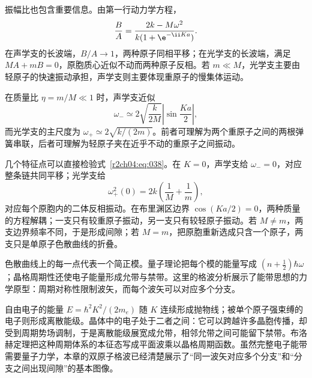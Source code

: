 振幅比也包含重要信息。由第一行动力学方程，
\[
 \frac BA=\frac{2k-M\omega^2}{k(1+\e^{-\ii Ka})}.
\]
在声学支的长波端，$B/A\to1$，两种原子同相平移；在光学支的长波端，满足
$MA+mB=0$，原胞质心近似不动而两种原子反相。若 $m\ll M$，光学支主要由轻原子的快速振动承担，声学支则主要体现重原子的慢集体运动。

在质量比 $\eta=m/M\ll1$ 时，声学支近似
\[
 \omega_-\simeq2\sqrt{\frac{k}{2M}}\left|\sin\frac{Ka}{2}\right|,
\]
而光学支的主尺度为
$\omega_+\simeq2\sqrt{k/(2m)}$。前者可理解为两个重原子之间的两根弹簧串联，后者可理解为轻原子夹在近乎不动的重原子之间振动。

几个特征点可以直接检验式~\eqref{r2ch04:eq:038}。在 $K=0$，声学支给 $\omega_-=0$，对应整条链共同平移；光学支给
\[
 \omega_+^2(0)=2k\left(\frac1M+\frac1m\right),
\]
对应每个原胞内的二体反相振动。在布里渊区边界 $\cos(Ka/2)=0$，两种质量的方程解耦；一支只有较重原子振动，另一支只有较轻原子振动。若 $M\ne m$，两支边界频率不同，于是形成间隙；若 $M=m$，把原胞重新选成只含一个原子，两支只是单原子色散曲线的折叠。

色散曲线上的每一点代表一个简正模。量子理论把每个模的能量写成 $(n+\tfrac12)\hbar\omega$；晶格周期性还使电子能量形成允带与禁带。这里的格波分析展示了能带思想的力学原型：周期对称性限制波矢，而每个波矢可以对应多个分支。

自由电子的能量 $E=\hbar^2K^2/(2m_e)$ 随 $K$ 连续形成抛物线；被单个原子强束缚的电子则形成离散能级。晶体中的电子处于二者之间：它可以跨越许多晶胞传播，却受到周期势场调制，于是离散能级展宽成允带，相邻允带之间可能留下禁带。布洛赫定理把这种周期体系的本征态写成平面波乘以晶格周期函数。虽然完整电子能带需要量子力学，本章的双原子格波已经清楚展示了“同一波矢对应多个分支”和“分支之间出现间隙”的基本图像。
